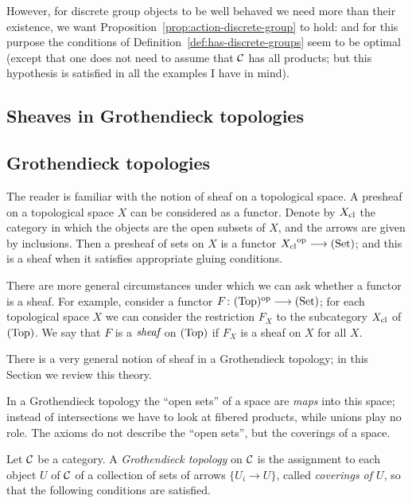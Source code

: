 \begin{2   CONTRAVARIANT FUNCTORS}
\begin{2.2 Group objects}
\begin{remark}
However, for discrete group objects to be well behaved we need more than their existence, we want Proposition~\ref{prop:action-discrete-group} to hold: and for this purpose the conditions of Definition~\ref{def:has-discrete-groups} seem to be optimal (except that one does not need to assume that $\mathcal{C}$ has all products; but this hypothesis is satisfied in all the examples I have in mind).
\end{remark}

\end{2.2 Group objects}
\begin{2.3 Sheaves in Grothendieck topologies}
\setcounter{section}{2}
\section{Sheaves in Grothendieck topologies}\label{sec:sheaves}

\subsection{Grothendieck topologies}

The reader is familiar with the notion of sheaf on a topological space. A presheaf on a topological space $X$ can be considered as a functor. Denote by $X_\mathrm{cl}$ the category in which the objects are the open subsets of $X$, and the arrows are given by inclusions. Then a presheaf of sets on $X$ is a functor ${X\cl}\op \arr \catset$; and this is a sheaf when it satisfies appropriate gluing conditions. 

There are more general circumstances under which we can ask whether a functor is a sheaf. For example, consider a functor $F \colon \cattop\op \arr \catset$; for each topological space $X$ we can consider the restriction $F_X$ to the subcategory $X_\mathrm{cl}$ of $(\mathrm{Top})$. We say that $F$ is a $\emph{sheaf}$ on $(\mathrm{Top})$ if $F_X$ is a sheaf on $X$ for all $X$.

There is a very general notion of  sheaf in a Grothendieck topology; in this Section we review this theory.

In a Grothendieck topology the ``open sets'' of a space are \emph{maps} into this space; instead of intersections we have to look at fibered products, while unions play no role. The axioms do not describe the ``open sets'', but the coverings of a space.

\begin{definition}
Let $\mathcal{C}$ be a category. A \emph{Grothendieck topology} on $\mathcal{C}$ is the assignment to each object $U$ of $\mathcal{C}$ of a collection of sets of arrows $\{U_i \to U\}$, called \emph{coverings of $U$}, so that the following conditions are satisfied.


\end{definition}
\end{2.3 Sheaves in Grothendieck topologies}
\end{2   CONTRAVARIANT FUNCTORS}
